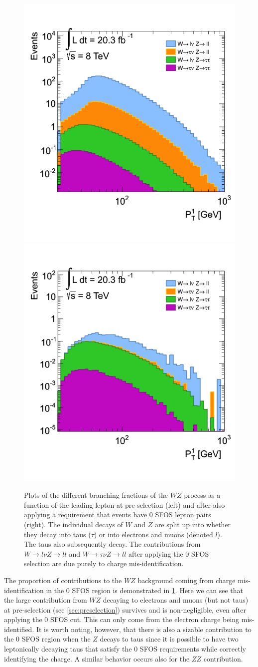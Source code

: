 \begin{figure}[ht]
\centering
\includegraphics[width=.45\textwidth]{figures/ChargeMisID/preselection_wz_br.png}
\includegraphics[width=.45\textwidth]{figures/ChargeMisID/0sfos_wz_br.png}
\caption{Plots of the different branching fractions of the $WZ$ process
as a function of the leading lepton \pt at pre-selection (left)
and after also applying a requirement that events have 0 SFOS lepton
pairs (right). The individual decays of $W$ and $Z$ are split up
into whether they decay into taus ($\tau$) or into electrons and muons (denoted $l$).
The taus also subsequently decay. The contributions from $W\to l\nu Z\to ll$ 
and $W \to \tau \nu Z \to ll$ after applying the 0 SFOS selection
are due purely to charge mis-identification.}
\label{fig:chargemisid_wz_br}
\end{figure}

The proportion of contributions to the $WZ$ background coming from 
charge mis-identification in the 0 SFOS region is demonstrated in 
\fig\ref{fig:chargemisid_wz_br}. Here we can see that the 
large contribution from $WZ$ decaying to electrons and muons (but not taus)
at pre-selection (see \sec\ref{sec:preselection})
survives and is non-negligible, even after applying the 0 SFOS cut.
This can only come from the electron charge being mis-identified.
It is worth noting, however, that there is also a sizable
contribution to the 0 SFOS region when the $Z$ decays to taus
since it is possible to have two leptonically decaying taus that satisfy
the 0 SFOS requirements while correctly identifying the charge.
A similar behavior occurs also for the $ZZ$ contribution.


